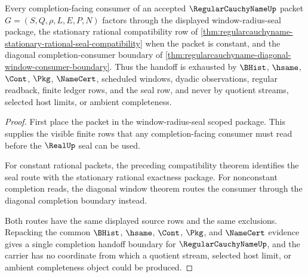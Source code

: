 \begin{theorem}
\label{thm:regularcauchyname-completion-handoff-non-escape}
Every completion-facing consumer of an accepted $\RegularCauchyNameUp$ packet $G=(S,Q,\rho,L,E,P,N)$ factors through the displayed window-radius-seal package, the stationary rational compatibility row of \autoref{thm:regularcauchyname-stationary-rational-seal-compatibility} when the packet is constant, and the diagonal completion-consumer boundary of \autoref{thm:regularcauchyname-diagonal-window-consumer-boundary}. Thus the handoff is exhausted by $\BHist$, $\hsame$, $\Cont$, $\Pkg$, $\NameCert$, scheduled windows, dyadic observations, regular readback, finite ledger rows, and the seal row, and never by quotient streams, selected host limits, or ambient completeness.
\end{theorem}
\begin{proof}
First place the packet in the window-radius-seal scoped package. This supplies the visible finite rows that any completion-facing consumer must read before the $\RealUp$ seal can be used.

For constant rational packets, the preceding compatibility theorem identifies the seal route with the stationary rational exactness package. For nonconstant completion reads, the diagonal window theorem routes the consumer through the diagonal completion boundary instead.

Both routes have the same displayed source rows and the same exclusions. Repacking the common $\BHist$, $\hsame$, $\Cont$, $\Pkg$, and $\NameCert$ evidence gives a single completion handoff boundary for $\RegularCauchyNameUp$, and the carrier has no coordinate from which a quotient stream, selected host limit, or ambient completeness object could be produced.
\end{proof}

